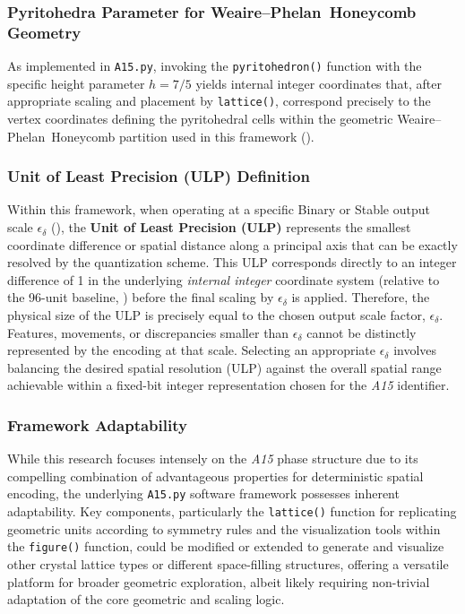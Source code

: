 \documentclass[10pt]{article}
\def\AAAB{\textit{A15}}
\def\WP{Weaire--Phelan}
\def\WPH{\WP{}~Honeycomb}
\begin{document}
\subsubsection{Pyritohedra Parameter for \WPH{} Geometry}\label{subsubsec:notes-h75}
As implemented in \texttt{A15.py}, invoking the \texttt{pyritohedron()} function with the specific height parameter $h=7/5$ yields internal integer coordinates that, after appropriate scaling and placement by \texttt{lattice()}, correspond precisely to the vertex coordinates defining the pyritohedral cells within the geometric \WPH{} partition used in this framework ().

\subsubsection{Unit of Least Precision (ULP) Definition}\label{subsubsec:notes-ulp}
Within this framework, when operating at a specific Binary or Stable output scale $\epsilon_\delta$ (), the \textbf{Unit of Least Precision (ULP)} represents the smallest coordinate difference or spatial distance along a principal axis that can be exactly resolved by the quantization scheme. This ULP corresponds directly to an integer difference of \num{1} in the underlying \emph{internal integer} coordinate system (relative to the 96-unit baseline, ) before the final scaling by $\epsilon_\delta$ is applied. Therefore, the physical size of the ULP is precisely equal to the chosen output scale factor, $\epsilon_\delta$. Features, movements, or discrepancies smaller than $\epsilon_\delta$ cannot be distinctly represented by the encoding at that scale. Selecting an appropriate $\epsilon_\delta$ involves balancing the desired spatial resolution (ULP) against the overall spatial range achievable within a fixed-bit integer representation chosen for the \AAAB{} identifier.

\subsubsection{Framework Adaptability}\label{subsubsec:notes-adaptability}
While this research focuses intensely on the \AAAB{} phase structure due to its compelling combination of advantageous properties for deterministic spatial encoding, the underlying \texttt{A15.py} software framework possesses inherent adaptability. Key components, particularly the \texttt{lattice()} function for replicating geometric units according to symmetry rules and the visualization tools within the \texttt{figure()} function, could be modified or extended to generate and visualize other crystal lattice types or different space-filling structures, offering a versatile platform for broader geometric exploration, albeit likely requiring non-trivial adaptation of the core geometric and scaling logic.
\end{document}
